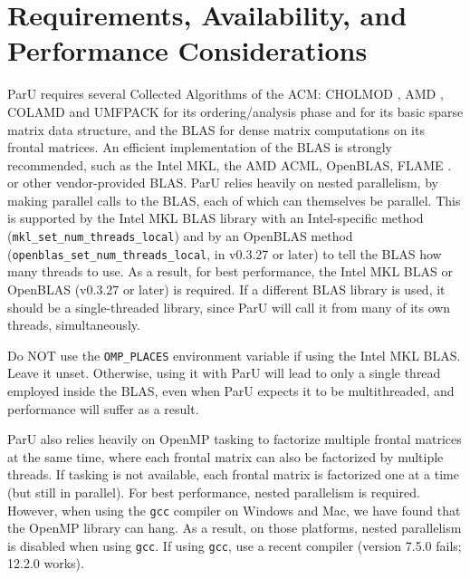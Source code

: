 \documentclass[12pt]{article}
\begin{document}
\section{Requirements, Availability, and Performance Considerations}
\label{summary}

ParU requires several Collected Algorithms of the ACM: CHOLMOD
\cite{ChenDavisHagerRajamanickam09,DavisHager09}, AMD
\cite{AmestoyDavisDuff96,AmestoyDavisDuff03}, COLAMD
\cite{DavisGilbertLarimoreNg00_algo,DavisGilbertLarimoreNg00} and UMFPACK
\cite{10.1145/992200.992206} for its ordering/analysis phase and for its basic
sparse matrix data structure, and the BLAS \cite{dddh:90} for dense matrix
computations on its frontal matrices.  An efficient implementation of the BLAS
is strongly recommended, such as the Intel MKL, the AMD ACML, OpenBLAS, FLAME
\cite{GotoVanDeGeijn08}. or other vendor-provided BLAS.  ParU relies heavily on
nested parallelism, by making parallel calls to the BLAS, each of which can
themselves be parallel.  This is supported by the Intel MKL BLAS library with
an Intel-specific method (\verb'mkl_set_num_threads_local') and by an OpenBLAS
method (\verb'openblas_set_num_threads_local', in v0.3.27 or later) to tell the
BLAS how many threads to use.  As a result, for best performance, the Intel MKL
BLAS or OpenBLAS (v0.3.27 or later) is required.
If a different BLAS library is used, it should be a single-threaded library,
since ParU will call it from many of its own threads, simultaneously.

Do NOT use the
\verb'OMP_PLACES' environment variable if using the Intel MKL BLAS.  Leave it
unset.  Otherwise, using it with ParU will lead to only a single thread
employed inside the BLAS, even when ParU expects it to be multithreaded,
and performance will suffer as a result.

ParU also relies heavily on OpenMP tasking to factorize multiple frontal
matrices at the same time, where each frontal matrix can also be factorized by
multiple threads.  If tasking is not available, each frontal matrix is
factorized one at a time (but still in parallel).  For best performance, nested
parallelism is required.  However, when using the \verb'gcc' compiler on
Windows and Mac, we have found that the OpenMP library can hang.  As a result,
on those platforms, nested parallelism is disabled when using \verb'gcc'.
If using \verb'gcc', use a recent compiler (version 7.5.0 fails; 12.2.0
works).
\end{document}
